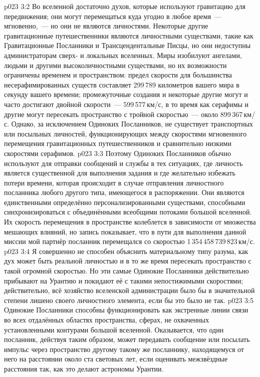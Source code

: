 \vs p023 3:2 \pc Во вселенной достаточно духов, которые используют гравитацию для передвижения; они могут перемещаться куда угодно в любое время~--- мгновенно,~--- но они не являются личностями. Некоторые другие гравитационные путешественники являются личностными существами, такие как Гравитационные Посланники и Трансцендентальные Писцы, но они недоступны администраторам сверх- и локальных вселенных. Миры изобилуют ангелами, людьми и другими высоколичностными существами, но их возможности ограничены временем и пространством: предел скорости для большинства несерафимированных существ составляет 299\,789 километров вашего мира в секунду вашего времени; промежуточные создания и некоторые другие могут и часто достигают двойной скорости~--- 599\,577\,км/с, в то время как серафимы и другие могут пересекать пространство с тройной скоростью~--- около 899\,367\,км/с. Однако, за исключением Одиноких Посланников, не существует транспортных или посыльных личностей, функционирующих между скоростями мгновенного перемещения гравитационных путешественников и сравнительно низкими скоростями серафимов.
\vs p023 3:3 Поэтому Одиноких Посланников обычно используют для отправки сообщений и службы в тех ситуациях, где личность является существенной для выполнения задания и где желательно избежать потери времени, которая происходит в случае отправления личностного посланника любого другого типа, имеющегося в распоряжении. Они являются единственными определённо персонализированными существами, способными синхронизироваться с объединёнными всеобщими потоками большой вселенной. Их скорость перемещения в пространстве колеблется в зависимости от множества мешающих влияний, но запись показывает, что в пути для выполнения данной миссии мой партнёр посланник перемещался со скоростью 1\,354\,458\,739\,823\,км/с.
\vs p023 3:4 Я совершенно не способен объяснить материальному типу разума, как дух может быть реальной личностью и в то же время пересекать пространство с такой огромной скоростью. Но эти самые Одинокие Посланники действительно прибывают на Урантию и покидают её с такими непостижимыми скоростями; действительно, всё хозяйство вселенской администрации было бы в значительной степени лишено своего личностного элемента, если бы это было не так.
\vs p023 3:5 \pc Одинокие Посланники способны функционировать как экстренные линии связи во всех отдалённых областях пространства, сферах, не охваченных установленными контурами большой вселенной. Оказывается, что один посланник, действуя таким образом, может передавать сообщение или посылать импульс через пространство другому такому же посланнику, находящемуся от него на расстоянии около ста световых лет, если оценивать межзвёздные расстояния так, как это делают астрономы Урантии.
